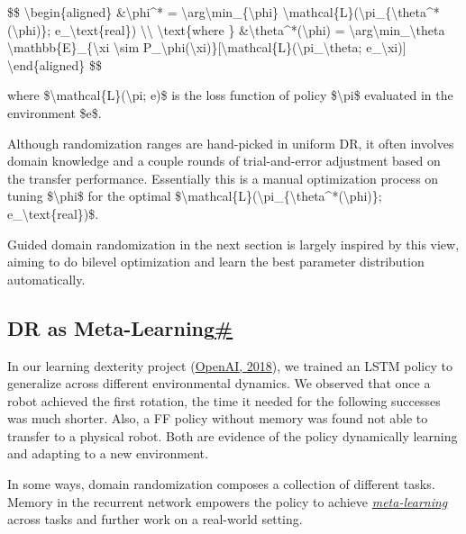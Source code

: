 \$\$ \textbackslash begin\{aligned\} \&\textbackslash phi\^{}* = \textbackslash arg\textbackslash min\_\{\textbackslash phi\} \textbackslash mathcal\{L\}(\textbackslash pi\_\{\textbackslash theta\^{}*(\textbackslash phi)\}; e\_\textbackslash text\{real\}) \textbackslash\textbackslash{} \textbackslash text\{where \} \&\textbackslash theta\^{}*(\textbackslash phi) = \textbackslash arg\textbackslash min\_\textbackslash theta \textbackslash mathbb\{E\}\_\{\textbackslash xi \textbackslash sim P\_\textbackslash phi(\textbackslash xi)\}{[}\textbackslash mathcal\{L\}(\textbackslash pi\_\textbackslash theta; e\_\textbackslash xi){]} \textbackslash end\{aligned\} \$\$

where \$\textbackslash mathcal\{L\}(\textbackslash pi; e)\$ is the loss function of policy \$\textbackslash pi\$ evaluated in the environment \$e\$.

Although randomization ranges are hand-picked in uniform DR, it often involves domain knowledge and a couple rounds of trial-and-error adjustment based on the transfer performance. Essentially this is a manual optimization process on tuning \$\textbackslash phi\$ for the optimal \$\textbackslash mathcal\{L\}(\textbackslash pi\_\{\textbackslash theta\^{}*(\textbackslash phi)\}; e\_\textbackslash text\{real\})\$.

Guided domain randomization in the next section is largely inspired by this view, aiming to do bilevel optimization and learn the best parameter distribution automatically.

\subsection{\texorpdfstring{DR as Meta-Learning\hyperref[dr-as-meta-learning]{\#}}{DR as Meta-Learning\#}}\label{dr-as-meta-learning}

In our learning dexterity project (\href{https://arxiv.org/abs/1808.00177}{OpenAI, 2018}), we trained an LSTM policy to generalize across different environmental dynamics. We observed that once a robot achieved the first rotation, the time it needed for the following successes was much shorter. Also, a FF policy without memory was found not able to transfer to a physical robot. Both are evidence of the policy dynamically learning and adapting to a new environment.

In some ways, domain randomization composes a collection of different tasks. Memory in the recurrent network empowers the policy to achieve \href{https://lilianweng.github.io/posts/2018-11-30-meta-learning/}{\emph{meta-learning}} across tasks and further work on a real-world setting.

